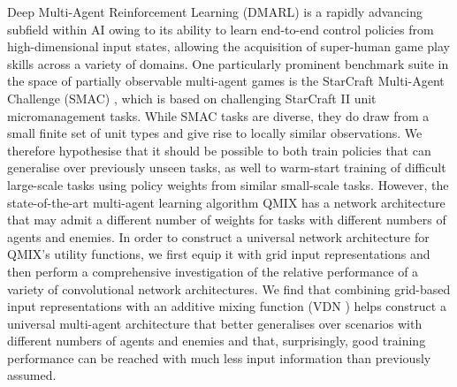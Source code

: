 Deep Multi-Agent Reinforcement Learning (DMARL) is a rapidly advancing subfield within AI owing to its ability to learn end-to-end control policies from high-dimensional input states, allowing the acquisition of super-human game play skills across a variety of domains. One particularly prominent benchmark suite in the space of partially observable multi-agent games is the StarCraft Multi-Agent Challenge (SMAC) \cite{smac}, which is based on challenging StarCraft II unit micromanagement tasks. 
While SMAC tasks are diverse, they do draw from a small finite set of unit types and give rise to locally similar observations. We therefore hypothesise that it should be possible to both train policies that can generalise over previously unseen tasks, as well to warm-start training of difficult large-scale tasks using policy weights from similar small-scale tasks.
However, the state-of-the-art multi-agent learning algorithm QMIX \cite{qmixcite} has a network architecture that may admit a different number of weights for tasks with different numbers of agents and enemies.  
In order to construct a universal network architecture for QMIX's utility functions, we first equip it with grid input representations and then perform a comprehensive investigation of the relative performance of a variety of convolutional network architectures. We find that combining grid-based input representations with an additive mixing function (VDN \cite{vdn}) helps construct a universal multi-agent architecture that better generalises over scenarios with different numbers of agents and enemies and that, surprisingly, good training performance can be reached with much less input information than previously assumed.